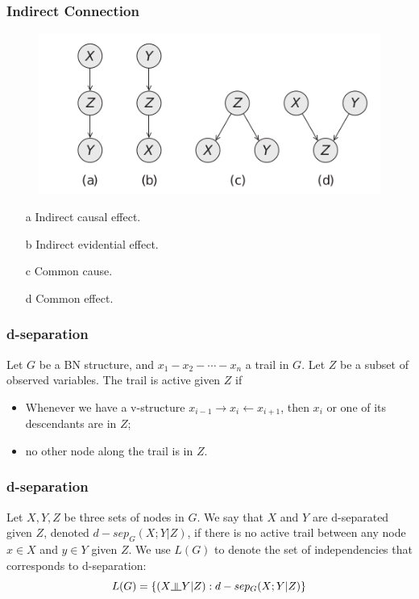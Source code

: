 \documentclass[11pt]{beamer}
\newcommand{\indep}{\rotatebox[origin=c]{90}{$\models$}}
\begin{document}
\begin{frame}
\frametitle{Indirect Connection}
\begin{figure}
	\centering
	\includegraphics[width=0.7\linewidth]{pic/indirect}
	\label{fig:indirect}
\end{figure}

\begin{enumerate}
	\item [a] Indirect causal effect.
	\item [b] Indirect evidential effect.
	\item [c] Common cause.
	\item [d] Common effect.
\end{enumerate}

\end{frame}

\begin{frame}
\frametitle{d-separation}

\begin{definition}
Let $G$ be a BN structure, and $x_1-x_2-\cdots -x_n$ a trail in $G$. Let $Z$ be a subset of observed variables. The trail is active given $Z$ if 
\begin{itemize}
	\item Whenever we have a v-structure $x_{i-1}\rightarrow x_i \leftarrow x_{i+1}$, then $x_i$ or one of its descendants are in $Z$;
	\item no other node along the trail is in $Z$.
\end{itemize}
\end{definition}

\end{frame}


\begin{frame}
\frametitle{d-separation}

\begin{definition}
	Let $X, Y, Z$ be three sets of nodes in $G$. We say that $X$ and $Y$ are d-separated given $Z$, denoted $d-sep_G(X;Y | Z)$, if there is no active trail between any node $x \in X$ and $y \in Y$ given $Z$. We use $L(G)$ to denote the set of independencies that corresponds to d-separation:
	\[
		L(G)=\{(X \indep Y | Z): d-sep_G(X; Y| Z)\}
	\]
\end{definition}

\end{frame}
\end{document}
